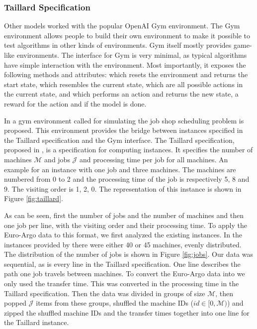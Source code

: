 


\subsubsection{Taillard Specification}\label{sec:taillard}

Other models worked with the popular OpenAI Gym environment. The Gym
environment allows people to build their own environment to make it possible
to test \rl algorithms in other kinds of environments. Gym itself mostly
provides game-like environments. The interface for Gym is very minimal, as
typical \rl algorithms have simple interaction with the environment. Most
importantly, it exposes the following methods and attributes:
 which resets the environment and returns the start state,
 which resembles the current state,
 which are all possible actions in the current state,
and  which performs an action and returns the new
state, a reward for the action and if the model is done.

In  a gym environment called  for simulating
the job shop scheduling problem is proposed. This environment provides the
bridge between instances specified in the Taillard specification and the Gym
interface. The Taillard specification, proposed in , is a
specification for computing instances. It specifies the number of machines
$\mathcal{M}$ and jobs $\mathcal{J}$ and processing time per job for all
machines. An example for an instance with one job and three machines. The
machines are numbered from 0 to 2 and the processing time of the job is
respectively 5, 8 and 9. The visiting order is 1, 2, 0. The representation of
this instance is shown in Figure \ref{fig:taillard}.



As can be seen, first the number of jobs and the number of machines and then
one job per line, with the visiting order and their processing time. To apply
the Euro-Argo data to this format, we first analyzed the existing
instances. In the instances provided by  there were either
40 or 45 machines, evenly distributed. The distribution of the number of jobs
is shown in Figure \ref{fig:jobs}. Our data was sequential, as is every line in
the Taillard specification. One line describes the path one job travels
between machines. To convert the Euro-Argo data into we only used the transfer
time. This was converted in the processing time in the Taillard specification.
Then the data was divided in groups of size $\mathcal{M}$, then popped
$\mathcal{J}$ items from these groups, shuffled the machine IDs ($id \in [0,
\mathcal{M})$) and zipped the shuffled machine IDs and the transfer times
together into one line for the Taillard instance.


